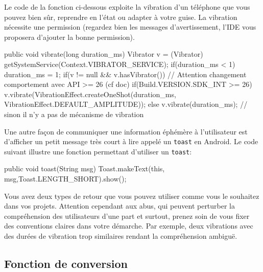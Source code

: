 \documentclass[a4paper,10pt]{article}
\newenvironment{boxcode}%
{\begin{tcolorbox}[breakable,colback=gray!5!white,colframe=black]}%
	{\end{tcolorbox}}
\begin{document}
Le code de la fonction ci-dessous exploite la vibration d'un téléphone que vous pouvez bien sûr, reprendre en l'état ou adapter à votre guise.
La vibration nécessite une permission (regardez bien les messages d'avertissement, l'IDE vous proposera d'ajouter la bonne permission).


\begin{boxcode}
	\begin{javasansbord}
public void vibrate(long duration_ms) {
	Vibrator v = (Vibrator) getSystemService(Context.VIBRATOR_SERVICE);
	if(duration_ms < 1)
		duration_ms = 1;
	if(v != null && v.hasVibrator()) {
		// Attention changement comportement avec API >= 26 (cf doc)
		if(Build.VERSION.SDK_INT >= 26) {
			v.vibrate(VibrationEffect.createOneShot(duration_ms,
					VibrationEffect.DEFAULT_AMPLITUDE));
		}
		else {
			v.vibrate(duration_ms);
		}
	}
	// sinon il n'y a pas de mécanisme de vibration
}
	\end{javasansbord}
\end{boxcode}

Une autre façon de communiquer une information éphémère à l'utilisateur est d'afficher un petit message très court à lire appelé un \texttt{toast} en Android. Le code suivant illustre une fonction permettant d'utiliser un \texttt{toast}:

\begin{boxcode}
	\begin{javasansbord}
public void toast(String msg) {
	Toast.makeText(this, msg,Toast.LENGTH_SHORT).show();
}
	\end{javasansbord}
\end{boxcode}

Vous avez deux types de retour que vous pouvez utiliser comme vous le souhaitez dans vos projets. Attention cependant aux abus, qui peuvent perturber la compréhension des utilisateurs d'une part et surtout, prenez soin de vous fixer des conventions claires dans votre démarche. Par exemple, deux vibrations avec des durées de vibration trop similaires rendant la compréhension ambiguë.

\subsection{Fonction de conversion}
\end{document}
